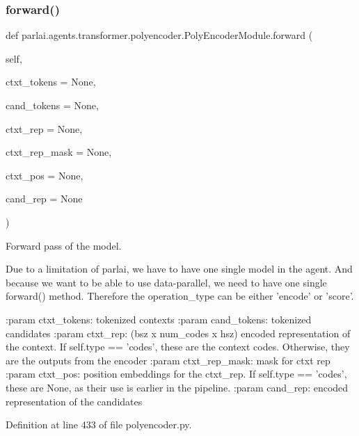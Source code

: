 \subsubsection{\texorpdfstring{forward()}{forward()}}
{\footnotesize\ttfamily def parlai.\+agents.\+transformer.\+polyencoder.\+Poly\+Encoder\+Module.\+forward (\begin{DoxyParamCaption}\item[{}]{self,  }\item[{}]{ctxt\+\_\+tokens = {\ttfamily None},  }\item[{}]{cand\+\_\+tokens = {\ttfamily None},  }\item[{}]{ctxt\+\_\+rep = {\ttfamily None},  }\item[{}]{ctxt\+\_\+rep\+\_\+mask = {\ttfamily None},  }\item[{}]{ctxt\+\_\+pos = {\ttfamily None},  }\item[{}]{cand\+\_\+rep = {\ttfamily None} }\end{DoxyParamCaption})}

\begin{DoxyVerb}Forward pass of the model.

Due to a limitation of parlai, we have to have one single model
in the agent. And because we want to be able to use data-parallel,
we need to have one single forward() method.
Therefore the operation_type can be either 'encode' or 'score'.

:param ctxt_tokens:
    tokenized contexts
:param cand_tokens:
    tokenized candidates
:param ctxt_rep:
    (bsz x num_codes x hsz)
    encoded representation of the context. If self.type == 'codes', these
    are the context codes. Otherwise, they are the outputs from the
    encoder
:param ctxt_rep_mask:
    mask for ctxt rep
:param ctxt_pos:
    position embeddings for the ctxt_rep. If self.type == 'codes', these
    are None, as their use is earlier in the pipeline.
:param cand_rep:
    encoded representation of the candidates
\end{DoxyVerb}
 

Definition at line 433 of file polyencoder.\+py.


